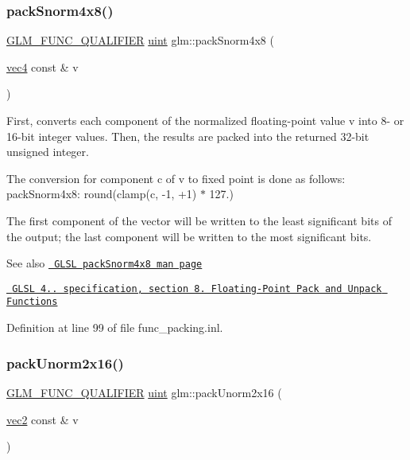 \subsubsection{\texorpdfstring{packSnorm4x8()}{packSnorm4x8()}}
{\footnotesize\ttfamily \mbox{\hyperlink{setup_8hpp_a33fdea6f91c5f834105f7415e2a64407}{G\+L\+M\+\_\+\+F\+U\+N\+C\+\_\+\+Q\+U\+A\+L\+I\+F\+I\+ER}} \mbox{\hyperlink{group__core__precision_ga4fd29415871152bfb5abd588334147c8}{uint}} glm\+::pack\+Snorm4x8 (\begin{DoxyParamCaption}\item[{\mbox{\hyperlink{group__core__types_ga5881b1b022d7fd1b7218f5916532dd02}{vec4}} const \&}]{v }\end{DoxyParamCaption})}

First, converts each component of the normalized floating-\/point value v into 8-\/ or 16-\/bit integer values. Then, the results are packed into the returned 32-\/bit unsigned integer.

The conversion for component c of v to fixed point is done as follows\+: pack\+Snorm4x8\+: round(clamp(c, -\/1, +1) $\ast$ 127.)

The first component of the vector will be written to the least significant bits of the output; the last component will be written to the most significant bits.

\begin{DoxySeeAlso}{See also}
\href{http://www.opengl.org/sdk/docs/manglsl/xhtml/packSnorm4x8.xml}{\texttt{ G\+L\+SL pack\+Snorm4x8 man page}} 

\href{http://www.opengl.org/registry/doc/GLSLangSpec.4.20.8.pdf}{\texttt{ G\+L\+SL 4.. specification, section 8. Floating-\/\+Point Pack and Unpack Functions}} 
\end{DoxySeeAlso}


Definition at line 99 of file func\+\_\+packing.\+inl.

\mbox{\label{group__core__func__packing_ga0659ddaf09727551c7bf51655d2a65cf}} 
\subsubsection{\texorpdfstring{packUnorm2x16()}{packUnorm2x16()}}
{\footnotesize\ttfamily \mbox{\hyperlink{setup_8hpp_a33fdea6f91c5f834105f7415e2a64407}{G\+L\+M\+\_\+\+F\+U\+N\+C\+\_\+\+Q\+U\+A\+L\+I\+F\+I\+ER}} \mbox{\hyperlink{group__core__precision_ga4fd29415871152bfb5abd588334147c8}{uint}} glm\+::pack\+Unorm2x16 (\begin{DoxyParamCaption}\item[{\mbox{\hyperlink{group__core__types_gaa1618f51db67eaa145db101d8c8431d8}{vec2}} const \&}]{v }\end{DoxyParamCaption})}

